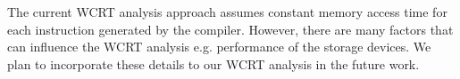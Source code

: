The current WCRT analysis approach assumes constant memory access time
for each instruction generated by the compiler. However, there are many
factors
\cite{Zhang:2014:DCR:2593069.2593124,Qin:2010:DBA:1878961.1878991,Chen:2013:DDH:2555692.2555699}
that can influence the WCRT analysis e.g. performance of the storage
devices. We plan to incorporate these details to our WCRT analysis in
the future work.






